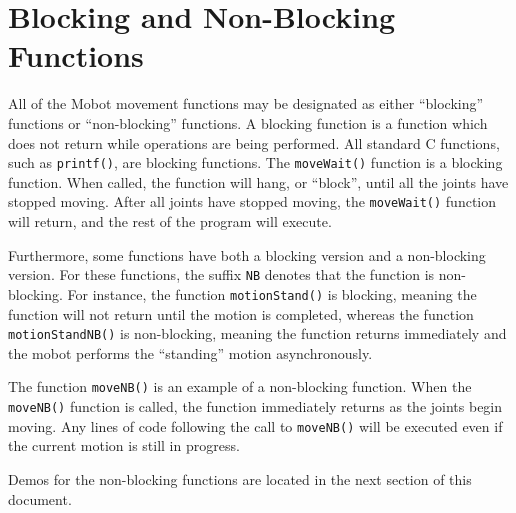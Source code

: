 \documentclass{article}
\begin{document}
\section{\label{sec:blocking}Blocking and Non-Blocking Functions}
All of the Mobot movement functions may be designated as either ``blocking'' 
functions or ``non-blocking'' functions. A blocking function is a function which
does not return while operations are being performed. All standard C functions,
such as \texttt{printf()}, are blocking functions. The
\texttt{moveWait()} function is a blocking function. When called, the function
will hang, or ``block'', until all the joints have stopped moving. After all
joints have stopped moving, the \texttt{moveWait()} function will return, and 
the rest of the program will execute.

Furthermore, some functions have both a blocking version and a non-blocking
version. For these functions, the suffix \texttt{NB} denotes that the function
is non-blocking. For instance, the function \texttt{motionStand()} is blocking,
meaning the function will not return until the motion is completed, whereas
the function \texttt{motionStandNB()} is non-blocking, meaning the function
returns immediately and the mobot performs the ``standing'' motion
asynchronously.

The function \texttt{moveNB()} is an example of a non-blocking function. When
the \texttt{moveNB()} function is called, the function immediately returns 
as the joints begin moving. Any lines of code following the call to 
\texttt{moveNB()} will be executed even if the current motion is still in
progress. 

Demos for the non-blocking functions are located in the next section of
this document.
\end{document}
